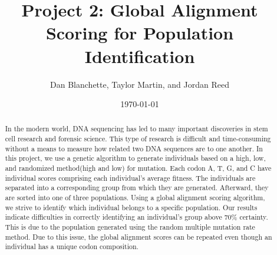 \documentclass[a4paper, 12pt, one column]{article}
\title{Project 2: Global Alignment Scoring for Population Identification}
\author{Dan Blanchette, Taylor Martin, and Jordan Reed}
\affil{CS415: Computational Biology, University of Idaho}
\date{\today}
\begin{document}
\maketitle
\begin{abstract}
In the modern world, DNA sequencing has led to many important discoveries in stem cell research and forensic science. This type of research is difficult and time-consuming without a means to measure how related two DNA sequences are to one another. In this project, we use a genetic algorithm to generate individuals based on a high, low, and randomized method(high and low) for mutation. Each codon A, T, G, and C have individual scores comprising each individual's average fitness. The individuals are separated into a corresponding group from which they are generated. Afterward, they are sorted into one of three populations. Using a global alignment scoring algorithm, we strive to identify which individual belongs to a specific population. Our results indicate difficulties in correctly identifying an individual's group above 70\% certainty. This is due to the population generated using the random multiple mutation rate method. Due to this issue, the global alignment scores can be repeated even though an individual has a unique codon composition.
\end{abstract}
\end{document}
